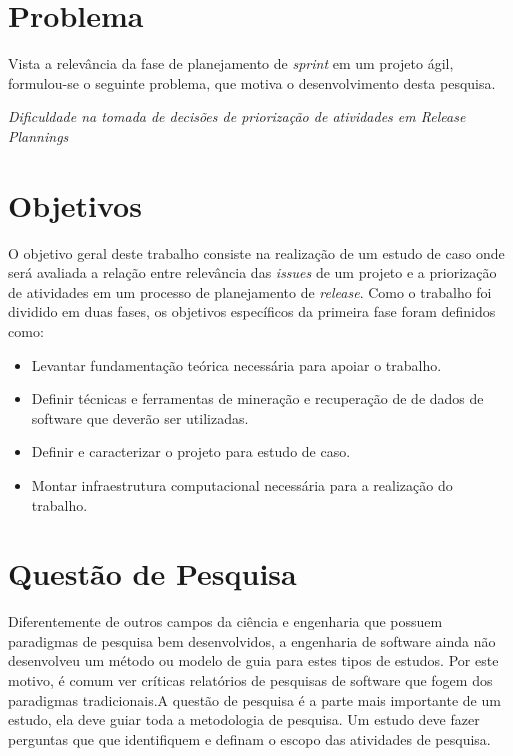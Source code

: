 \section{Problema}
\label{int:pro}
Vista a relevância da fase de planejamento de \textit{sprint} em um projeto ágil, formulou-se o seguinte problema, que motiva o desenvolvimento desta pesquisa.


\begin{center}
 \textit{Dificuldade na tomada de decisões de priorização de atividades em \textit{Release Plannings}}
\end{center}


\section{Objetivos}
\label{int:obj}

O objetivo geral deste trabalho consiste na realização de um estudo de caso onde será avaliada a relação entre relevância das \textit{issues} de um projeto e a priorização de atividades em um processo de planejamento de \textit{release}. Como o trabalho foi dividido em duas fases, os objetivos específicos da primeira fase foram definidos como:

\begin{itemize}
    \item Levantar fundamentação teórica necessária para apoiar o trabalho.
    \item Definir técnicas e ferramentas de mineração e recuperação de de dados de software que deverão ser utilizadas.
    \item Definir e caracterizar o projeto para estudo de caso.
    \item Montar infraestrutura computacional necessária para a realização do trabalho.
\end{itemize}

\section{Questão de Pesquisa}
\label{int:que}

Diferentemente de outros campos da ciência e engenharia que possuem paradigmas de pesquisa bem desenvolvidos, a engenharia de software ainda não desenvolveu um método ou modelo de guia para estes tipos de estudos. Por este motivo, é comum ver críticas relatórios de pesquisas de software que fogem dos paradigmas tradicionais\cite{shaw}.A questão de pesquisa é a parte mais importante de um estudo, ela deve guiar toda a metodologia de pesquisa. Um estudo deve fazer perguntas que que identifiquem e definam o escopo das atividades de pesquisa\cite{guidelines}.


